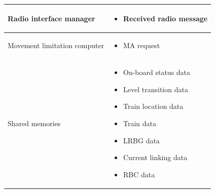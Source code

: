 \documentclass[nocc]{template/openetcs_report}
\begin{document}
\begin{longtable}{|l|l|}
				\hline	

					\begin{minipage}[t]{0.35\linewidth} Radio interface manager	\end{minipage} 
				&	\begin{minipage}[t]{0.65\linewidth}
						\begin{itemize}
							\item Received radio message
						\end{itemize}			
					\end{minipage} \\
				
				\hline	

					\begin{minipage}[t]{0.35\linewidth} Movement limitation computer	\end{minipage} 
				&	\begin{minipage}[t]{0.65\linewidth}
						\begin{itemize}
							\item MA request
						\end{itemize}			
					\end{minipage} \\
				
				\hline													
				
					\begin{minipage}[t]{0.35\linewidth} Shared memories	\end{minipage} 
				&	\begin{minipage}[t]{0.65\linewidth}
						\begin{itemize}
							\item On-board status data
							\item Level transition data
							\item Train location data
							\item Train data
							\item LRBG data
							\item Current linking data
							\item RBC data
						\end{itemize}				
					\end{minipage} \\
				
				\hline	
			\end{longtable}	
\end{document}
